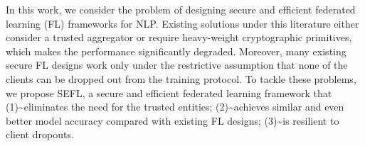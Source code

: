 In this work, we consider the problem of designing secure and efficient federated learning (FL) frameworks for NLP. Existing solutions under this literature either consider a trusted aggregator or require heavy-weight cryptographic primitives, which makes the performance significantly degraded. Moreover, many existing secure FL designs work only under the restrictive assumption that none of the clients can be dropped out from the training protocol. To tackle these problems, we propose SEFL, a secure and efficient federated learning framework that (1){\textasciitilde}eliminates the need for the trusted entities; (2){\textasciitilde}achieves similar and even better model accuracy compared with existing FL designs; (3){\textasciitilde}is resilient to client dropouts.
